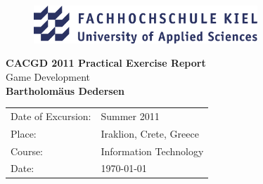 \documentclass[bibtotocnumbered, headsepline,normalheadings,12pt]{report}
\begin{document}
\begin{titlepage}
\thispagestyle{empty}
 \begin{center}
 \begin{figure}[htbp]
    \centering
     \includegraphics[width=0.75\textwidth]{fhkiel.png} 
\end{figure}

  \vspace*{2.5cm}
 {\bf \huge CACGD 2011 Practical Exercise Report}
 \vspace*{1cm} \\
 {\Large Game Development\\}
 \vspace{0.5cm}
 {\Large \bfseries Bartholomäus Dedersen\\}
 \vfill
  \vspace*{1.5cm}
\begin{table}[h]
    \centering
    \begin{tabular}{l l}
        Date of Excursion: & Summer 2011 \\ 
        Place: & Iraklion, Crete, Greece \\ 
        Course: & Information Technology \\
        Date: & \today\\
    \end{tabular}
\end{table}

 \end{center}
\end{titlepage}


\begin{abstract}

    In this report about the practical part of the ``Computational Aspects of Computer Games Development'' programme for two weeks in Crete a
    game development process written in the Python programming language is described. The controller is a neural interface for brainwave wavelength reception 
    through three skin-applied electrodes. The game is themed after a fictional Cretan Zombie incursion after the actual event.

\end{abstract}

\tableofcontents \newpage
\end{document}
